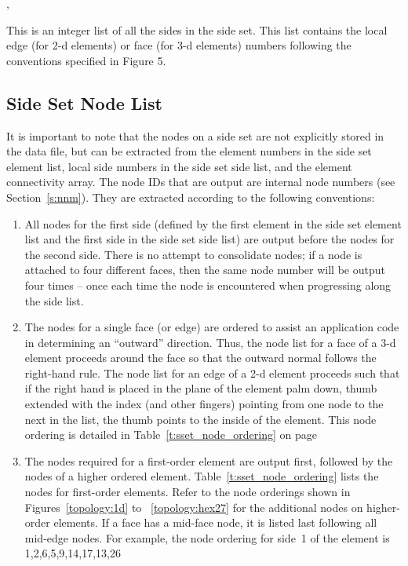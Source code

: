 \begin{spacing}{1.5}
\api {}, 
\end{spacing}

{This is an integer list of all the sides in the side set. 
This list contains the local edge (for 2-d elements) or face 
(for 3-d elements) numbers following the conventions specified 
in  Figure 5.}



\subsection{Side Set Node List}



\begin{spacing}{1.5}
\api {}
\end{spacing}

It is important to note that the nodes on a side set are 
not explicitly stored in the data file, but can be extracted 
from the element numbers in the side set element list, local 
side numbers in the side set side list, and the element connectivity 
array. The node IDs that are output are internal node numbers 
(see  Section~\ref{s:nnm}). They are extracted according to 
the following conventions:


\begin{enumerate}
\item {All nodes for the first side (defined by the first element 
in the side set element list and the first side in the side set side
list) are output before the nodes for the second side. There is no
attempt to consolidate nodes; if a node is attached to four different
faces, then the same node number will be output four times -- once
each time the node is encountered when progressing along the side
list.}

\item {The nodes for a single face (or edge) are ordered to assist 
an application code in determining an ``outward'' direction. Thus, the
node list for a face of a 3-d element proceeds around the face so that
the outward normal follows the right-hand rule. The node list for an
edge of a 2-d element proceeds such that if the right hand is placed
in the plane of the element palm down, thumb extended with the index
(and other fingers) pointing from one node to the next in the list,
the thumb points to the inside of the element. This node ordering is
detailed in Table~\ref{t:sset_node_ordering} on
page~\pageref{t:sset_node_ordering}}

\item {The nodes required for a first-order element are output 
first, followed by the nodes of a higher ordered
element. Table~\ref{t:sset_node_ordering} lists the nodes for
first-order elements.  Refer to the node orderings shown in
Figures~\ref{topology:1d} to ~\ref{topology:hex27} for the additional
nodes on higher-order elements. If a face has a mid-face node, it is
listed last following all mid-edge nodes.  For example, the node
ordering for side~1 of the  element is {1,2,6,5,9,14,17,13,26}}
\end{enumerate}

